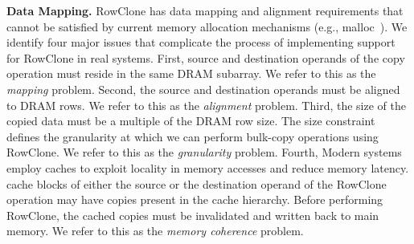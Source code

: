 \noindent
\textbf{{Data Mapping.}}
\label{sec:rowclone_alignment}
{RowClone has data mapping and alignment requirements that {cannot be} satisfied by current memory allocation mechanisms (e.g., malloc~\cite{malloc}). We identify four major issues that complicate the process of implementing support for RowClone in real systems. First,  source and destination operands  of the copy operation must reside in the same DRAM subarray. We refer to this as the \emph{mapping} problem. Second, the source and destination operands must be aligned to DRAM rows. We refer to this as the \emph{alignment} problem. Third, the size of the copied data must be a multiple of the DRAM row size. The size constraint defines the granularity at which we can perform bulk-copy operations using RowClone. We refer to this as the \emph{granularity} problem.} Fourth,  Modern systems employ caches to exploit locality in memory accesses and reduce memory latency.  cache blocks  of either the source or the destination operand of the RowClone operation {may} have  copies present in the cache hierarchy. Before performing RowClone, {the} cached copies  must be invalidated and written back to main memory. We refer to this as the %
{\emph{memory coherence}} problem.


